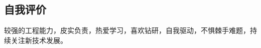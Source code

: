 \documentclass[line,margin,UTF8]{res}
\begin{document}
\begin{resume}



 \section{自我评价}
较强的工程能力，皮实负责，热爱学习，喜欢钻研，自我驱动，不惧棘手难题，持续关注新技术发展。

 
\end{resume}    
\end{document}
